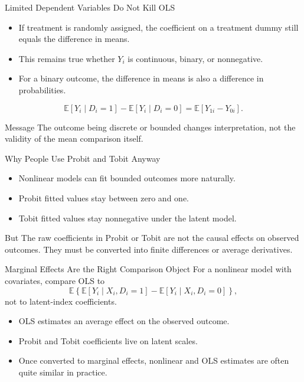 \documentclass[11pt,aspectratio=169]{beamer}
\newcommand{\E}{\mathbb{E}}
\begin{document}
\begin{frame}{Limited Dependent Variables Do Not Kill OLS}
  \begin{itemize}
    \item If treatment is randomly assigned, the coefficient on a treatment dummy still equals the difference in means.
    \item This remains true whether \(Y_i\) is continuous, binary, or nonnegative.
    \item For a binary outcome, the difference in means is also a difference in probabilities.
  \end{itemize}
  \[
    \E[Y_i \mid D_i=1]-\E[Y_i \mid D_i=0]=\E[Y_{1i}-Y_{0i}].
  \]
  \begin{block}{Message}
    The outcome being discrete or bounded changes interpretation, not the validity of the mean comparison itself.
  \end{block}
\end{frame}

\begin{frame}{Why People Use Probit and Tobit Anyway}
  \begin{itemize}
    \item Nonlinear models can fit bounded outcomes more naturally.
    \item Probit fitted values stay between zero and one.
    \item Tobit fitted values stay nonnegative under the latent model.
  \end{itemize}
  \begin{block}{But}
    The raw coefficients in Probit or Tobit are not the causal effects on observed outcomes. They must be converted into finite differences or average derivatives.
  \end{block}
\end{frame}

\begin{frame}{Marginal Effects Are the Right Comparison Object}
  For a nonlinear model with covariates, compare OLS to
  \[
    \E\left\{\E[Y_i \mid X_i,D_i=1]-\E[Y_i \mid X_i,D_i=0]\right\},
  \]
  not to latent-index coefficients.
  \begin{itemize}
    \item OLS estimates an average effect on the observed outcome.
    \item Probit and Tobit coefficients live on latent scales.
    \item Once converted to marginal effects, nonlinear and OLS estimates are often quite similar in practice.
  \end{itemize}
\end{frame}
\end{document}

